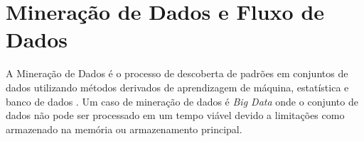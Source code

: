 \section{Mineração de Dados e Fluxo de Dados}


A Mineração de Dados é o processo de descoberta de padrões em conjuntos de dados
utilizando métodos derivados de aprendizagem de máquina, estatística e banco de
dados \cite{Gaber2005}. Um caso de mineração de dados é \emph{Big Data} onde o
conjunto de dados não pode ser processado em um tempo viável devido a limitações
como armazenado na memória ou armazenamento principal.

% 
% 


% 

